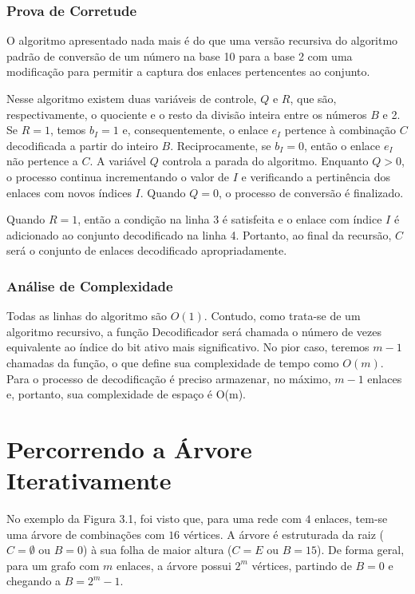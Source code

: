 \subsubsection{Prova de Corretude}

O algoritmo apresentado nada mais é do que uma versão recursiva do algoritmo padrão de conversão de um número na base 10 para a base 2 com uma modificação para permitir a captura dos enlaces pertencentes ao conjunto.

Nesse algoritmo existem duas variáveis de controle, $Q$ e $R$, que são, respectivamente, o quociente e o resto da divisão inteira entre os números $B$ e 2. Se $R=1$, temos $b_I=1$ e, consequentemente, o enlace $e_I$ pertence à combinação $C$ decodificada a partir do inteiro $B$. Reciprocamente, se $b_I=0$, então o enlace $e_I$ não pertence a $C$. A variável $Q$ controla a parada do algoritmo. Enquanto $Q>0$, o processo continua incrementando o valor de $I$ e verificando a pertinência dos enlaces com novos índices $I$. Quando $Q=0$, o processo de conversão é finalizado.

Quando $R=1$, então a condição na linha 3 é satisfeita e o enlace com índice $I$ é adicionado ao conjunto decodificado na linha 4. Portanto, ao final da recursão, $C$ será o conjunto de enlaces decodificado apropriadamente.

\subsubsection{Análise de Complexidade}

Todas as linhas do algoritmo são $O(1)$. Contudo, como trata-se de um algoritmo recursivo, a função Decodificador será chamada o número de vezes equivalente ao índice do bit ativo mais significativo. No pior caso, teremos $m-1$ chamadas da função, o que define sua complexidade de tempo como $O(m)$. Para o processo de decodificação é preciso armazenar, no máximo, $m-1$ enlaces e, portanto, sua complexidade de espaço é O(m).

\section{Percorrendo a Árvore Iterativamente}

No exemplo da Figura 3.1, foi visto que, para uma rede com $4$ enlaces, tem-se uma árvore de combinações com $16$ vértices. A árvore é estruturada da raiz ($C=\emptyset$ ou $B=0$) à sua folha de maior altura ($C=E$ ou $B=15$). De forma geral, para um grafo com $m$ enlaces, a árvore possui $2^m$ vértices, partindo de $B=0$ e chegando a $B=2^m-1$.

